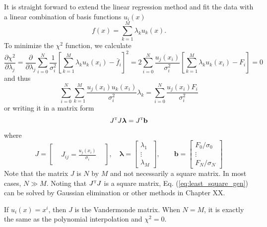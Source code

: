 It is straight forward to extend the linear regression method and fit the data with a linear combination of basis functions $u_i(x)$
\begin{equation}
f(x) = \sum_{k=1}^{M} \lambda_k u_k(x).
\end{equation}
To minimize the $\chi^2$ function, we calculate
\begin{equation}
\frac{\partial \chi^2}{\partial \lambda_j} = \frac{\partial}{\partial \lambda_j}  \sum_{i=0}^{N} \frac{1}{\sigma_i^2} \left [ \sum_{k=1}^{M} \lambda_k u_k(x_i)-\bar{f}_i \right ]^2 = 2 \sum_{i=0}^{N} \frac{u_j(x_i)}{\sigma_i^2} \left [ \sum_{k=1}^{M} \lambda_k u_k(x_i)-F_i \right ]=0 
\end{equation}
and thus
\begin{equation}
\sum_{i=0}^{N}  \sum_{k=1}^{M} \frac{u_j(x_i) u_k(x_i)}{\sigma_i^2} \lambda_k = \sum_{i=0}^{N} \frac{ u_j(x_i) F_i}{\sigma_i^2}
\end{equation}
or writing it in a matrix form
\begin{equation}\label{eq:least_square_gen}
J^\textsc{t} J\boldsymbol{\lambda} = J^\textsc{t} \mathbf{b}
\end{equation}
where 
\begin{equation}
J = \begin{bmatrix} & & \\ & J_{ij}=\displaystyle\frac{u_j(x_i)}{\sigma_i} & \\
& & \end{bmatrix}, \quad 
\boldsymbol{\lambda} = \begin{bmatrix} \lambda_1\\ \vdots \\ \lambda_{M} \end{bmatrix},\qquad
\mathbf{b} = \begin{bmatrix} F_0/\sigma_0\\ \vdots \\ F_{N}/\sigma_{N} \end{bmatrix}
\end{equation}
Note that the matrix $J$ is $N$ by $M$ and not necessarily a square matrix.  In most cases, $N \gg M$.
Noting that $J^\textsc{t} J$ is a square matrix, Eq. (\ref{eq:least_square_gen}) can be solved by Gaussian elimination or other methods in Chapter XX.

If $u_i(x) = x^i$, then $J$ is the Vandermonde matrix.  When $N=M$, it is exactly the same as the polynomial interpolation and $\chi^2=0$.  



